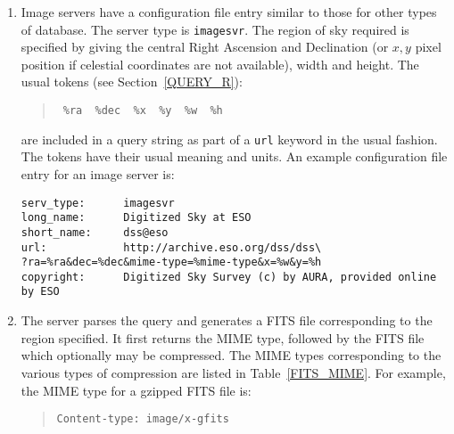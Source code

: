 \documentclass[twoside,11pt]{article}
\renewcommand{\_}{\texttt{\symbol{95}}}
\begin{document}
\begin{enumerate}

  \item Image servers have a configuration file entry similar to those
   for other types of database.  The server type is {\tt imagesvr}.
   The region of sky required is specified by giving the central
   Right Ascension and Declination (or $x,y$\/ pixel position if
   celestial coordinates are not available), width and height.  The
   usual tokens (see Section~\ref{QUERY_R}):

  \begin{quote}
  {\tt ~\%ra ~\%dec ~\%x ~\%y ~\%w ~\%h}
  \end{quote}

   are included in a query string as part of a {\tt url} keyword in the
   usual fashion.  The tokens have their usual meaning and units.  An
   example configuration file entry for an image server is:

\begin{verbatim}
serv_type:      imagesvr
long_name:      Digitized Sky at ESO
short_name:     dss@eso
url:            http://archive.eso.org/dss/dss\
?ra=%ra&dec=%dec&mime-type=%mime-type&x=%w&y=%h
copyright:      Digitized Sky Survey (c) by AURA, provided online by ESO
\end{verbatim}

  \item The server parses the query and generates a FITS file corresponding
   to the region specified.  It first returns the MIME type, followed
   by the FITS file which optionally may be compressed.  The MIME types
   corresponding to the various types of compression are listed in
   Table~\ref{FITS_MIME}.  For example, the MIME type for a gzipped
   FITS file is:

  \begin{quote}
   {\tt Content-type: image/x-gfits}
  \end{quote}

\end{enumerate}
\end{document}

